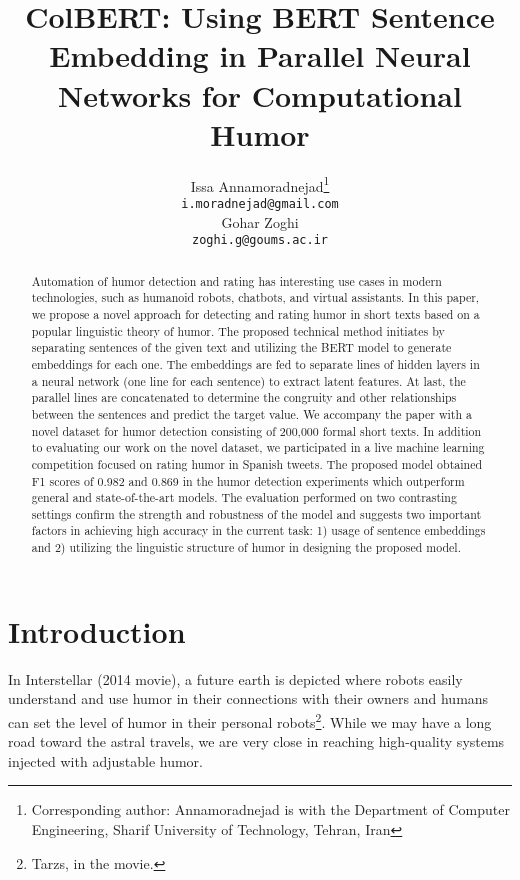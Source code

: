 \documentclass{article}
\title{ColBERT: Using BERT Sentence Embedding in Parallel Neural Networks for Computational Humor}
\author{Issa Annamoradnejad\thanks{Corresponding author: Annamoradnejad is with the Department of
Computer Engineering, Sharif University of Technology, Tehran, Iran}\\
  \texttt{i.moradnejad@gmail.com} \\
   \And
   Gohar Zoghi \\
   \texttt{zoghi.g@goums.ac.ir} \\
}
\begin{document}
\maketitle


\begin{abstract}
  Automation of humor detection and rating has interesting use cases in modern technologies, such as humanoid robots, chatbots, and virtual assistants. In this paper, we propose a novel approach for detecting and rating humor in short texts based on a popular linguistic theory of humor. The proposed technical method initiates by separating sentences of the given text and utilizing the BERT model to generate embeddings for each one. The embeddings are fed to separate lines of hidden layers in a neural network (one line for each sentence) to extract latent features. At last, the parallel lines are concatenated to determine the congruity and other relationships between the sentences and predict the target value. We accompany the paper with a novel dataset for humor detection consisting of 200,000 formal short texts. In addition to evaluating our work on the novel dataset, we participated in a live machine learning competition focused on rating humor in Spanish tweets. The proposed model obtained F1 scores of 0.982 and 0.869 in the humor detection experiments which outperform general and state-of-the-art models. The evaluation performed on two contrasting settings confirm the strength and robustness of the model and suggests two important factors in achieving high accuracy in the current task: 1) usage of sentence embeddings and 2) utilizing the linguistic structure of humor in designing the proposed model.
\end{abstract}


\section{Introduction}
\label{sec:intro}

In Interstellar (2014 movie), a future earth is depicted where robots easily understand and use humor in their connections with their owners and humans can set the level of humor in their personal robots\footnote{Tarzs, in the movie.}. While we may have a long road toward the astral travels, we are very close in reaching high-quality systems injected with adjustable humor. 
\end{document}
